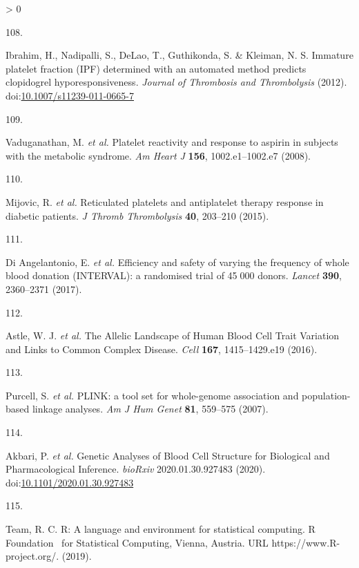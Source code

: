 \documentclass[11pt,twoside]{bristolthesis}
\newlength{\cslhangindent}
\newlength{\csllabelwidth}
\newenvironment{CSLReferences}[2] %
 {%
  \setlength{\parindent}{0pt}
  \ifodd #1 \everypar{\setlength{\hangindent}{\cslhangindent}}\ignorespaces\fi
  \ifnum #2 > 0
  \setlength{\parskip}{#2\baselineskip}
  \fi
 }%
 {}
\newcommand{\CSLLeftMargin}[1]{\parbox[t]{\csllabelwidth}{#1}}
\newcommand{\CSLRightInline}[1]{\parbox[t]{\linewidth - \csllabelwidth}{#1}\break}
\begin{document}
\begin{CSLReferences}{0}{0}
\leavevmode\hypertarget{ref-Ibrahim2012}{}%
\CSLLeftMargin{108. }
\CSLRightInline{Ibrahim, H., Nadipalli, S., DeLao, T., Guthikonda, S. \& Kleiman, N. S. {Immature platelet fraction (IPF) determined with an automated method predicts clopidogrel hyporesponsiveness}. \emph{Journal of Thrombosis and Thrombolysis} (2012). doi:\href{https://doi.org/10.1007/s11239-011-0665-7}{10.1007/s11239-011-0665-7}}

\leavevmode\hypertarget{ref-Vaduganathan2008a}{}%
\CSLLeftMargin{109. }
\CSLRightInline{Vaduganathan, M. \emph{et al.} {Platelet reactivity and response to aspirin in subjects with the metabolic syndrome}. \emph{Am Heart J} \textbf{156}, 1002.e1--1002.e7 (2008).}

\leavevmode\hypertarget{ref-Mijovic2015a}{}%
\CSLLeftMargin{110. }
\CSLRightInline{Mijovic, R. \emph{et al.} {Reticulated platelets and antiplatelet therapy response in diabetic patients}. \emph{J Thromb Thrombolysis} \textbf{40}, 203--210 (2015).}

\leavevmode\hypertarget{ref-DiAngelantonio2017}{}%
\CSLLeftMargin{111. }
\CSLRightInline{Di Angelantonio, E. \emph{et al.} {Efficiency and safety of varying the frequency of whole blood donation (INTERVAL): a randomised trial of 45 000 donors}. \emph{Lancet} \textbf{390}, 2360--2371 (2017).}

\leavevmode\hypertarget{ref-Astle2016}{}%
\CSLLeftMargin{112. }
\CSLRightInline{Astle, W. J. \emph{et al.} {The Allelic Landscape of Human Blood Cell Trait Variation and Links to Common Complex Disease}. \emph{Cell} \textbf{167}, 1415--1429.e19 (2016).}

\leavevmode\hypertarget{ref-Purcell2007a}{}%
\CSLLeftMargin{113. }
\CSLRightInline{Purcell, S. \emph{et al.} {PLINK: a tool set for whole-genome association and population-based linkage analyses}. \emph{Am J Hum Genet} \textbf{81}, 559--575 (2007).}

\leavevmode\hypertarget{ref-Akbari2020}{}%
\CSLLeftMargin{114. }
\CSLRightInline{Akbari, P. \emph{et al.} {Genetic Analyses of Blood Cell Structure for Biological and Pharmacological Inference}. \emph{bioRxiv} 2020.01.30.927483 (2020). doi:\href{https://doi.org/10.1101/2020.01.30.927483}{10.1101/2020.01.30.927483}}

\leavevmode\hypertarget{ref-Team2019a}{}%
\CSLLeftMargin{115. }
\CSLRightInline{Team, R. C. {R: A language and environment for statistical computing. R Foundation~ for Statistical Computing, Vienna, Austria. URL https://www.R-project.org/.} (2019).}


\end{CSLReferences}
\end{document}

